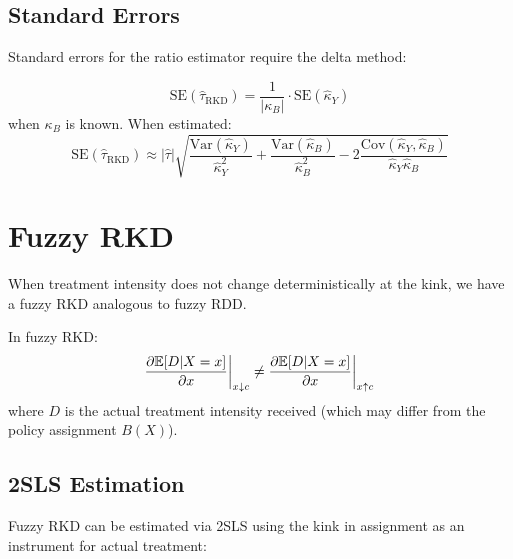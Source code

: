 \subsection{Standard Errors}

Standard errors for the ratio estimator require the delta method:

\begin{proposition}
\label{prop:rkd_delta_se}
\begin{equation}
    \text{SE}(\hat{\tau}_{\text{RKD}}) = \frac{1}{|\kappa_B|} \cdot \text{SE}(\hat{\kappa}_Y)
\end{equation}
when $\kappa_B$ is known. When estimated:
\begin{equation}
    \text{SE}(\hat{\tau}_{\text{RKD}}) \approx |\hat{\tau}| \sqrt{\frac{\text{Var}(\hat{\kappa}_Y)}{\hat{\kappa}_Y^2} + \frac{\text{Var}(\hat{\kappa}_B)}{\hat{\kappa}_B^2} - 2\frac{\text{Cov}(\hat{\kappa}_Y, \hat{\kappa}_B)}{\hat{\kappa}_Y \hat{\kappa}_B}}
\end{equation}
\end{proposition}

\section{Fuzzy RKD}
\label{sec:rkd_fuzzy}

When treatment intensity does not change deterministically at the kink, we have a fuzzy RKD analogous to fuzzy RDD.

\begin{definition}
\label{def:fuzzy_rkd}
In fuzzy RKD:
\begin{equation}
    \frac{\partial \mathbb{E}[D|X=x]}{\partial x}\bigg|_{x \downarrow c} \neq \frac{\partial \mathbb{E}[D|X=x]}{\partial x}\bigg|_{x \uparrow c}
\end{equation}
where $D$ is the actual treatment intensity received (which may differ from the policy assignment $B(X)$).
\end{definition}

\subsection{2SLS Estimation}

Fuzzy RKD can be estimated via 2SLS using the kink in assignment as an instrument for actual treatment:

